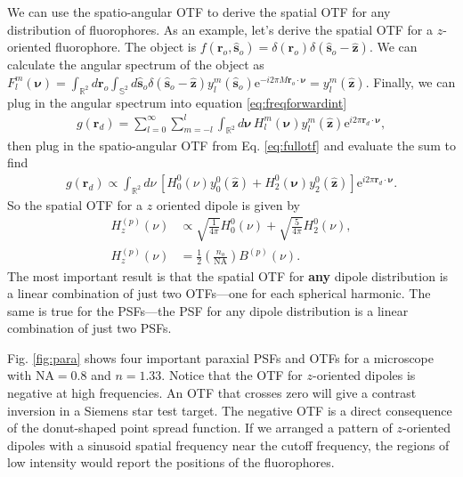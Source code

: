 \documentclass[11pt]{article}
\newcommand{\me}{\mathrm{e}}
\providecommand{\ro}[1]{\mathbf{\mathbf{r}}_o}
\providecommand{\so}[1]{\mathbf{\hat{s}}_o}
\providecommand{\rd}[1]{\mathbf{r}_d}
\providecommand{\mh}[1]{\mathbf{\hat{#1}}}
\providecommand{\bs}[1]{\boldsymbol{#1}}
\begin{document}
We can use the spatio-angular OTF to derive the spatial OTF for any distribution
of fluorophores. As an example, let's derive the spatial OTF for a $z$-oriented
fluorophore. The object is $f(\ro{}, \so{}) = \delta(\ro{})\delta(\so{} - \mh{z})$. We can calculate
the angular spectrum of the object as
$F_l^m(\bs{\nu}) = \int_{\mathbb{R}^2}d\ro{}\int_{\mathbb{S}^2}d\so{} \delta(\so{} - \mh{z})y_l^m(\so{})\me{}^{-i2\pi M\ro{}\cdot\bs{\nu}} =
y_l^m(\mh{z})$. Finally, we can plug in the angular spectrum
into equation \ref{eq:freqforwardint}
\begin{align}
  g(\rd{}) = \sum_{l=0}^{\infty} \sum_{m=-l}^l \int_{\mathbb{R}^2}d\bs{\nu}{}\, H_l^m(\bs{\nu}) y_l^m(\mh{z}) \me^{i 2\pi \rd{}\cdot\bs{\nu}}, \label{eq:freqforwardint}
\end{align}
then plug in the spatio-angular OTF from Eq. \ref{eq:fullotf} and evaluate the
sum to find
\begin{align}
  g(\rd{}) \propto \int_{\mathbb{R}^2}d\nu{}\, \left[H_0^0(\nu)y_0^0(\mh{z}) + H_2^0(\bs{\nu})y_2^0(\mh{z})\right] \me^{i 2\pi \rd{}\cdot\bs{\nu}}. \label{eq:freqforwardint}
\end{align}
So the spatial OTF for a $z$ oriented dipole is given by
\begin{align}
  H_z^{(p)}(\nu) &\propto \sqrt{\frac{1}{4\pi}}H_0^0(\nu) + \sqrt{\frac{5}{4\pi}}H_2^0(\nu), \\
    H_z^{(p)}(\nu) &= \frac{1}{2}\left(\frac{n_o}{\text{NA}}\right) B^{(p)}(\nu).
\end{align}
The most important result is that the spatial OTF for \textbf{any} dipole
distribution is a linear combination of just two OTFs---one for each spherical
harmonic. The same is true for the PSFs---the PSF for any dipole
distribution is a linear combination of just two PSFs. 

Fig. \ref{fig:para} shows four important paraxial PSFs and OTFs for a microscope
with $\text{NA}=0.8$ and $n=1.33$. Notice that the OTF for $z$-oriented
dipoles is negative at high frequencies. An OTF that crosses zero will give a
contrast inversion in a Siemens star test target. The negative OTF is a direct
consequence of the donut-shaped point spread function. If we arranged a pattern
of $z$-oriented dipoles with a sinusoid spatial frequency near the cutoff
frequency, the regions of low intensity would report the positions of the
fluorophores.
\end{document}
